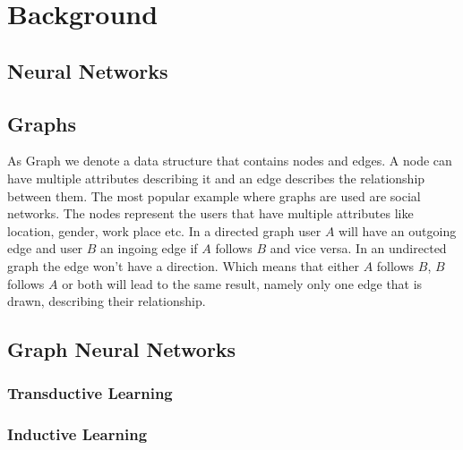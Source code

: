 \chapter{Background}

  \section{Neural Networks}

	\section{Graphs}

		As Graph we denote a data structure that contains nodes and edges. A node can have multiple attributes describing it and an edge describes the relationship between them. The most popular example where graphs are used are social networks. The nodes represent the users that have multiple attributes like location, gender, work place etc. In a directed graph user $A$ will have an outgoing edge and user $B$ an ingoing edge if $A$ follows $B$ and vice versa. In an undirected graph the edge won't have a direction. Which means that either $A$ follows $B$, $B$ follows $A$ or both will lead to the same result, namely only one edge that is drawn, describing their relationship.

	\section{Graph Neural Networks}
      

    \subsection{Transductive Learning}

    \subsection{Inductive Learning}

